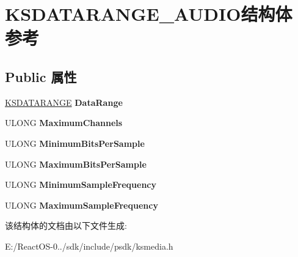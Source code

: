 \hypertarget{struct_k_s_d_a_t_a_r_a_n_g_e___a_u_d_i_o}{}\section{K\+S\+D\+A\+T\+A\+R\+A\+N\+G\+E\+\_\+\+A\+U\+D\+I\+O结构体 参考}
\label{struct_k_s_d_a_t_a_r_a_n_g_e___a_u_d_i_o}
\subsection*{Public 属性}
\begin{DoxyCompactItemize}
\item 
\mbox{\label{struct_k_s_d_a_t_a_r_a_n_g_e___a_u_d_i_o_ac813d951cb63f7de6b5e0cc7c18c136d}} 
\hyperlink{struct_k_s_d_a_t_a_f_o_r_m_a_t}{K\+S\+D\+A\+T\+A\+R\+A\+N\+GE} {\bfseries Data\+Range}
\item 
\mbox{\label{struct_k_s_d_a_t_a_r_a_n_g_e___a_u_d_i_o_a0833265b8f9cc420f2321b9bbe8aa6ae}} 
U\+L\+O\+NG {\bfseries Maximum\+Channels}
\item 
\mbox{\label{struct_k_s_d_a_t_a_r_a_n_g_e___a_u_d_i_o_a6da7ed494cfa0f11cfe1d91c664f0871}} 
U\+L\+O\+NG {\bfseries Minimum\+Bits\+Per\+Sample}
\item 
\mbox{\label{struct_k_s_d_a_t_a_r_a_n_g_e___a_u_d_i_o_ab16363498207d22501834543f35c3afd}} 
U\+L\+O\+NG {\bfseries Maximum\+Bits\+Per\+Sample}
\item 
\mbox{\label{struct_k_s_d_a_t_a_r_a_n_g_e___a_u_d_i_o_aee794ef5401e207da52714156369073a}} 
U\+L\+O\+NG {\bfseries Minimum\+Sample\+Frequency}
\item 
\mbox{\label{struct_k_s_d_a_t_a_r_a_n_g_e___a_u_d_i_o_ab17b43eea8ed34632c193818125e7ca2}} 
U\+L\+O\+NG {\bfseries Maximum\+Sample\+Frequency}
\end{DoxyCompactItemize}


该结构体的文档由以下文件生成\+:\begin{DoxyCompactItemize}
\item 
E\+:/\+React\+O\+S-\/0../sdk/include/psdk/ksmedia.\+h\end{DoxyCompactItemize}
